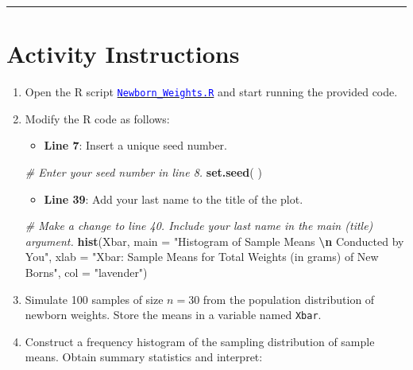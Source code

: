 \documentclass[oneside,openany]{book}
\newenvironment{Shaded}{\begin{snugshade}}{\end{snugshade}}
\newcommand{\AttributeTok}[1]{\textcolor[rgb]{0.13,0.29,0.53}{#1}}
\newcommand{\CommentTok}[1]{\textcolor[rgb]{0.56,0.35,0.01}{\textit{#1}}}
\newcommand{\FunctionTok}[1]{\textcolor[rgb]{0.13,0.29,0.53}{\textbf{#1}}}
\newcommand{\NormalTok}[1]{#1}
\newcommand{\SpecialCharTok}[1]{\textcolor[rgb]{0.81,0.36,0.00}{\textbf{#1}}}
\newcommand{\StringTok}[1]{\textcolor[rgb]{0.31,0.60,0.02}{#1}}
\providecommand{\tightlist}{%
  \setlength{\itemsep}{0pt}\setlength{\parskip}{0pt}}
\begin{document}
\begin{center}\rule{0.5\linewidth}{0.5pt}\end{center}

\section{Activity Instructions}\label{activity-instructions-2}

\begin{enumerate}
\def\labelenumi{\arabic{enumi}.}
\tightlist
\item
  Open the R script \href{https://raw.githubusercontent.com/aslemand/Data-Analysis-Activities/main/data/Activity_3/Newborn_Weights.R}{\textcolor{blue}{\texttt{Newborn\_Weights.R}}} and start running the provided code.
\item
  Modify the R code as follows:

  \begin{itemize}
  \tightlist
  \item
    \textbf{Line 7}: Insert a unique seed number.
  \end{itemize}

\begin{Shaded}
\begin{Highlighting}[]
\CommentTok{\# Enter your seed number in line 8.}
\FunctionTok{set.seed}\NormalTok{( )}
\end{Highlighting}
\end{Shaded}

  \begin{itemize}
  \tightlist
  \item
    \textbf{Line 39}: Add your last name to the title of the plot.
  \end{itemize}

\begin{Shaded}
\begin{Highlighting}[]
\CommentTok{\# Make a change to line 40. Include your last name in the main (title) argument.}
\FunctionTok{hist}\NormalTok{(Xbar, }
   \AttributeTok{main =} \StringTok{"Histogram of Sample Means }\SpecialCharTok{\textbackslash{}n}\StringTok{ Conducted by You"}\NormalTok{, }
   \AttributeTok{xlab =} \StringTok{"Xbar: Sample Means for Total Weights (in grams) of New Borns"}\NormalTok{, }
   \AttributeTok{col =} \StringTok{"lavender"}\NormalTok{)}
\end{Highlighting}
\end{Shaded}
\item
  Simulate 100 samples of size \(n = 30\) from the population distribution of newborn weights. Store the means in a variable named \texttt{Xbar}.
\item
  Construct a frequency histogram of the sampling distribution of sample means. Obtain summary statistics and interpret:


\end{enumerate}
\end{document}
